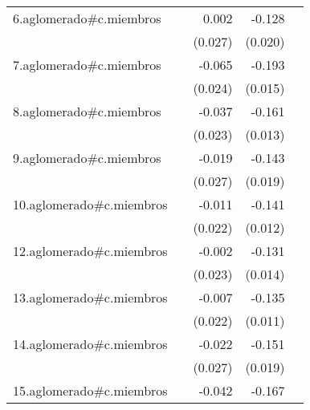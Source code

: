 {\begin{longtable}{l*{4}{D{.}{.}{-1}}}
\addlinespace
6.aglomerado#c.miembros&                     &       0.002         &      -0.128\sym{***}&                     \\
            &                     &     (0.027)         &     (0.020)         &                     \\
\addlinespace
7.aglomerado#c.miembros&                     &      -0.065\sym{**} &      -0.193\sym{***}&                     \\
            &                     &     (0.024)         &     (0.015)         &                     \\
\addlinespace
8.aglomerado#c.miembros&                     &      -0.037         &      -0.161\sym{***}&                     \\
            &                     &     (0.023)         &     (0.013)         &                     \\
\addlinespace
9.aglomerado#c.miembros&                     &      -0.019         &      -0.143\sym{***}&                     \\
            &                     &     (0.027)         &     (0.019)         &                     \\
\addlinespace
10.aglomerado#c.miembros&                     &      -0.011         &      -0.141\sym{***}&                     \\
            &                     &     (0.022)         &     (0.012)         &                     \\
\addlinespace
12.aglomerado#c.miembros&                     &      -0.002         &      -0.131\sym{***}&                     \\
            &                     &     (0.023)         &     (0.014)         &                     \\
\addlinespace
13.aglomerado#c.miembros&                     &      -0.007         &      -0.135\sym{***}&                     \\
            &                     &     (0.022)         &     (0.011)         &                     \\
\addlinespace
14.aglomerado#c.miembros&                     &      -0.022         &      -0.151\sym{***}&                     \\
            &                     &     (0.027)         &     (0.019)         &                     \\
\addlinespace
15.aglomerado#c.miembros&                     &      -0.042         &      -0.167\sym{***}&                     \\

\end{longtable}}
